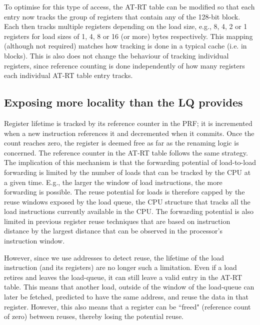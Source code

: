 \documentclass{sig-alternate}
\begin{document}
To optimise for this type of access, the AT-RT table can be modified so that each entry now tracks the group of registers that contain any of the 128-bit block. Each then tracks multiple registers depending on the load size, e.g., 8, 4, 2 or 1 registers for load sizes of 1, 4, 8 or 16 (or more) bytes respectively. This mapping (although not required) matches how tracking is done in a typical cache (i.e. in blocks). This is also does not change the behaviour of tracking individual registers, since reference counting is done independently of how many registers each individual AT-RT table entry tracks. 




\subsection{Exposing more locality than the LQ provides}
Register lifetime is tracked by its reference counter in the PRF; it is incremented when a new instruction references it and decremented when it commits. Once the count reaches zero, the register is deemed free as far as the renaming logic is concerned. The reference counter in the AT-RT table follows the same strategy. The implication of this mechanism is that the forwarding potential of load-to-load forwarding is limited by the number of loads that can be tracked by the CPU at a given time. E.g., the larger the window of load instructions, the more forwarding is possible. The reuse potential for loads is therefore capped by the reuse windows exposed by the load queue, the CPU structure that tracks all the load instructions currently available in the CPU. The forwarding potential is also limited in previous register reuse techniques that are based on instruction distance by the largest distance that can be observed in the processor's instruction window.


However, since we use addresses to detect reuse, the lifetime of the load instruction (and its registers) are no longer such a limitation. Even if a load retires and leaves the load-queue, it can still leave a valid entry in the AT-RT table. This means that another load, outside of the window of the load-queue can later be fetched, predicted to have the same address, and reuse the data in that register. However, this also means that a register can be ``freed" (reference count of zero) between reuses, thereby losing the potential reuse. 
\end{document}
